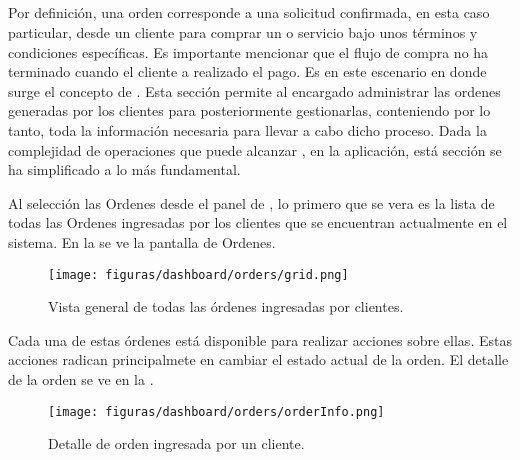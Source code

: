 \subsection{\ordersEF}

	Por definición, una orden corresponde a una solicitud confirmada, en esta caso particular, desde un cliente para comprar un \itemCOM o servicio bajo unos términos y condiciones específicas. Es importante mencionar que el flujo de compra no ha terminado cuando el cliente a realizado el pago. Es en este escenario en donde surge el concepto de \orderFulfillmentCOM.
	Esta sección permite al encargado administrar las ordenes generadas por los clientes para posteriormente gestionarlas, conteniendo por lo tanto, toda la información necesaria para llevar a cabo dicho proceso.
	Dada la complejidad de operaciones que puede alcanzar \orderFulfillmentCOM, en la aplicación, está sección se ha simplificado a lo más fundamental.

	Al selección las Ordenes desde el panel de \dashboardEF, lo primero que se vera es la lista de todas las Ordenes ingresadas por los clientes que se encuentran actualmente en el sistema. En la  se ve la pantalla de Ordenes.


	\begin{figure}[h!]
		\centering
		\texttt{[image: figuras/dashboard/orders/grid.png]}
		\caption{Vista general de todas las órdenes ingresadas por clientes.}
		\label{figure:dashboard:orders:grid}
	\end{figure}

	Cada una de estas órdenes está disponible para realizar acciones sobre ellas. Estas acciones radican principalmete en cambiar el estado actual de la orden. El detalle de la orden se ve en la .
	\begin{figure}[h!]
		\centering
		\texttt{[image: figuras/dashboard/orders/orderInfo.png]}
		\caption{Detalle de orden ingresada por un cliente.}
		\label{figure:dashboard:orders:orderInfo}
	\end{figure}